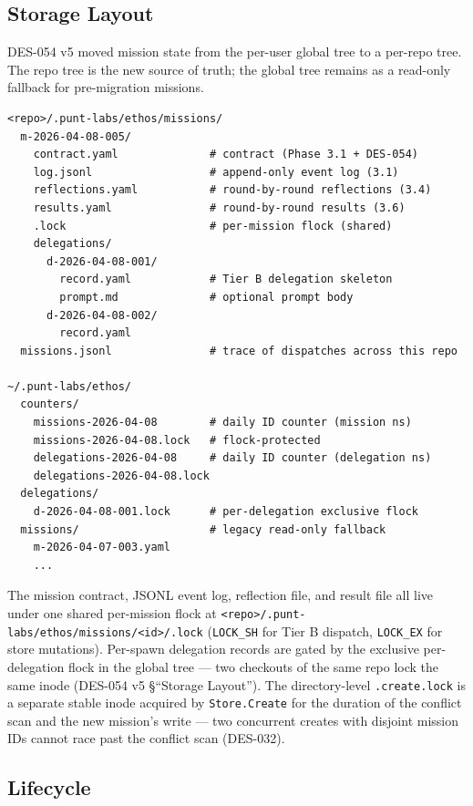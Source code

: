\documentclass[a4paper,10pt]{article}
\newcommand{\fpath}[1]{\texttt{#1}}
\begin{document}
\subsection{Storage Layout}

DES-054 v5 moved mission state from the per-user global tree to a
per-repo tree.  The repo tree is the new source of truth; the
global tree remains as a read-only fallback for pre-migration
missions.

\begin{verbatim}
<repo>/.punt-labs/ethos/missions/
  m-2026-04-08-005/
    contract.yaml              # contract (Phase 3.1 + DES-054)
    log.jsonl                  # append-only event log (3.1)
    reflections.yaml           # round-by-round reflections (3.4)
    results.yaml               # round-by-round results (3.6)
    .lock                      # per-mission flock (shared)
    delegations/
      d-2026-04-08-001/
        record.yaml            # Tier B delegation skeleton
        prompt.md              # optional prompt body
      d-2026-04-08-002/
        record.yaml
  missions.jsonl               # trace of dispatches across this repo

~/.punt-labs/ethos/
  counters/
    missions-2026-04-08        # daily ID counter (mission ns)
    missions-2026-04-08.lock   # flock-protected
    delegations-2026-04-08     # daily ID counter (delegation ns)
    delegations-2026-04-08.lock
  delegations/
    d-2026-04-08-001.lock      # per-delegation exclusive flock
  missions/                    # legacy read-only fallback
    m-2026-04-07-003.yaml
    ...
\end{verbatim}

The mission contract, JSONL event log, reflection file, and result
file all live under one shared per-mission flock at
\fpath{<repo>/.punt-labs/ethos/missions/<id>/.lock} (\texttt{LOCK\_SH} for
Tier B dispatch, \texttt{LOCK\_EX} for store mutations).  Per-spawn
delegation records are gated by the exclusive per-delegation flock
in the global tree --- two checkouts of the same repo lock the same
inode (DES-054 v5 §``Storage Layout'').  The directory-level
\fpath{.create.lock} is a separate stable inode acquired by
\texttt{Store.Create} for the duration of the conflict scan and
the new mission's write --- two concurrent creates with disjoint
mission IDs cannot race past the conflict scan (DES-032).

\subsection{Lifecycle}
\end{document}
